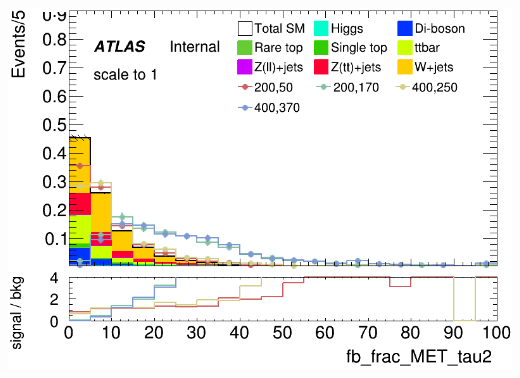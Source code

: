 \documentclass[usenames,dvipsnames]{beamer}
\begin{document}
\begin{frame}
\begin{minipage}{0.32\textwidth}
        \includegraphics[width=\textwidth]{graphics/LH_met_sig/LH_fb_frac_MET_tau2_norm.png}
    \end{minipage}
    
    \vspace{0.5cm}


\end{frame}
\end{document}

